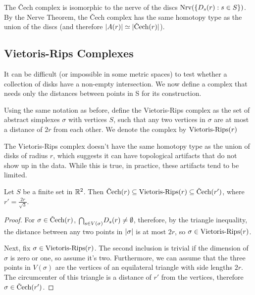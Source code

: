 The \v{C}ech complex is isomorphic to the nerve of the discs $\textrm{Nrv}(\{D_s(r): s \in S\})$. By the Nerve Theorem, the \v{C}ech complex has the same homotopy type as the union of the discs (and therefore $\abs{A(r)} \simeq \abs{\cech(r)}$).


\subsection{Vietoris-Rips Complexes}


It can be difficult (or impossible in some metric spaces) to test whether a collection of disks have a non-empty intersection. We now define a complex that needs only the distances between points in S for its construction.


\begin{definition}
Using the same notation as before, define the Vietoris-Rips complex as the set of abstract simplexes $\sigma$ with vertices $S$, such that any two vertices in $\sigma$ are at most a distance of $2r$ from each other. We denote the complex by $\textrm{Vietoris-Rips}(r)$
\end{definition}


The Vietoris-Rips complex doesn't have the same homotopy type as the union of disks of radius $r$, which suggests it can have topological artifacts that do not show up in the data. While this is true, in practice, these artifacts tend to be limited.


\begin{proposition}
Let $S$ be a finite set in $\mathbb{R}^2$. Then $\cech(r) \subseteq \rips(r) \subseteq \cech(r')$, where $r' = \frac {2r}{\sqrt{3}}$.
\end{proposition}


\begin{proof}
For $\sigma \in \cech(r)$, $\mathsmaller{\bigcap}_{s \in V(\sigma)} D_s(r) \not = \emptyset$, therefore, by the triangle inequality, the distance between any two points in $\lvert\sigma\rvert$ is at most $2r$, so $\sigma \in \textrm{Vietoris-Rips}(r)$.


Next, fix $\sigma \in \textrm{Vietoris-Rips}(r)$. The second inclusion is trivial if the dimension of $\sigma$ is zero or one, so assume it's two. Furthermore, we can assume that the three points in $V(\sigma)$ are the vertices of an equilateral triangle with side lengths $2r$. The circumcenter of this triangle is a distance of $r'$ from the vertices, therefore $\sigma \in \cech(r')$.
\end{proof}


